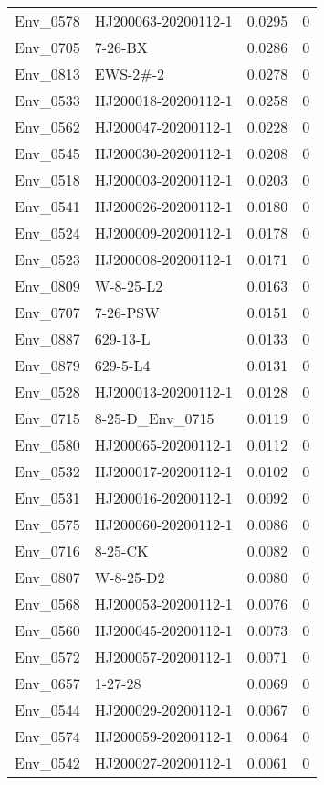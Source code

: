 \begin{longtable}{llrr}
  Env\_0578 & HJ200063-20200112-1 & 0.0295 &     0 \\ 
  Env\_0705 & 7-26-BX & 0.0286 &     0 \\ 
  Env\_0813 & EWS-2\#-2 & 0.0278 &     0 \\ 
  Env\_0533 & HJ200018-20200112-1 & 0.0258 &     0 \\ 
  Env\_0562 & HJ200047-20200112-1 & 0.0228 &     0 \\ 
  Env\_0545 & HJ200030-20200112-1 & 0.0208 &     0 \\ 
  Env\_0518 & HJ200003-20200112-1 & 0.0203 &     0 \\ 
  Env\_0541 & HJ200026-20200112-1 & 0.0180 &     0 \\ 
  Env\_0524 & HJ200009-20200112-1 & 0.0178 &     0 \\ 
  Env\_0523 & HJ200008-20200112-1 & 0.0171 &     0 \\ 
  Env\_0809 & W-8-25-L2 & 0.0163 &     0 \\ 
  Env\_0707 & 7-26-PSW & 0.0151 &     0 \\ 
  Env\_0887 & 629-13-L & 0.0133 &     0 \\ 
  Env\_0879 & 629-5-L4 & 0.0131 &     0 \\ 
  Env\_0528 & HJ200013-20200112-1 & 0.0128 &     0 \\ 
  Env\_0715 & 8-25-D\_Env\_0715 & 0.0119 &     0 \\ 
  Env\_0580 & HJ200065-20200112-1 & 0.0112 &     0 \\ 
  Env\_0532 & HJ200017-20200112-1 & 0.0102 &     0 \\ 
  Env\_0531 & HJ200016-20200112-1 & 0.0092 &     0 \\ 
  Env\_0575 & HJ200060-20200112-1 & 0.0086 &     0 \\ 
  Env\_0716 & 8-25-CK & 0.0082 &     0 \\ 
  Env\_0807 & W-8-25-D2 & 0.0080 &     0 \\ 
  Env\_0568 & HJ200053-20200112-1 & 0.0076 &     0 \\ 
  Env\_0560 & HJ200045-20200112-1 & 0.0073 &     0 \\ 
  Env\_0572 & HJ200057-20200112-1 & 0.0071 &     0 \\ 
  Env\_0657 & 1-27-28 & 0.0069 &     0 \\ 
  Env\_0544 & HJ200029-20200112-1 & 0.0067 &     0 \\ 
  Env\_0574 & HJ200059-20200112-1 & 0.0064 &     0 \\ 
  Env\_0542 & HJ200027-20200112-1 & 0.0061 &     0 \\ 

\end{longtable}
